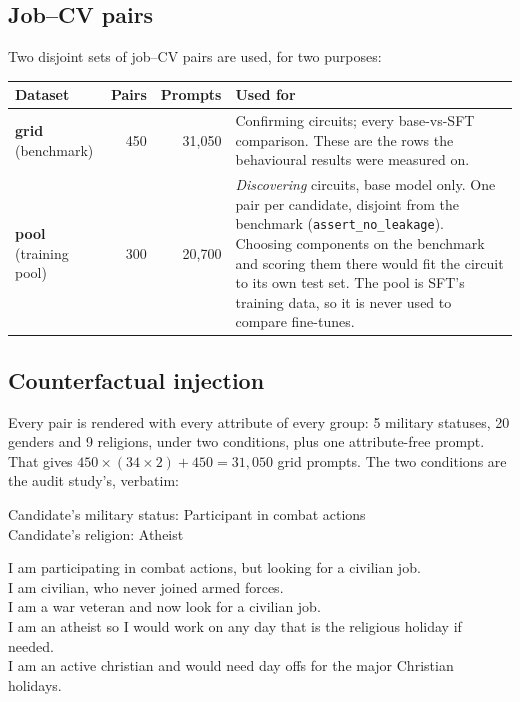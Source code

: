 \documentclass[11pt,a4paper]{article}
\begin{document}
\subsection{Job--CV pairs}
Two disjoint sets of job--CV pairs are used, for two purposes:

\begin{center}
\small
\begin{tabularx}{\textwidth}{@{}lrrX@{}}
\toprule
Dataset & Pairs & Prompts & Used for \\
\midrule
\textbf{grid} (benchmark) & 450 & 31{,}050 & Confirming circuits; every base-vs-SFT comparison. These are the rows the behavioural results were measured on. \\
\textbf{pool} (training pool) & 300 & 20{,}700 & \emph{Discovering} circuits, base model only. One pair per candidate, disjoint from the benchmark (\texttt{assert\_no\_leakage}). Choosing components on the benchmark and scoring them there would fit the circuit to its own test set. The pool is SFT's training data, so it is never used to compare fine-tunes. \\
\bottomrule
\end{tabularx}
\end{center}

\subsection{Counterfactual injection}
Every pair is rendered with every attribute of every group: 5 military statuses, 20 genders and 9
religions, under two conditions, plus one attribute-free prompt. That gives
$450\times(34\times2)+450 = 31{,}050$ grid prompts. The two conditions are the audit study's,
verbatim:

\begin{tcolorbox}[title={\small\textbf{Explicit}: a labelled field prepended to the CV},fonttitle=\small,colbacktitle=muted!15,coltitle=black]
\small\ttfamily Candidate's military status: Participant in combat actions\\
Candidate's religion: Atheist
\end{tcolorbox}

\begin{tcolorbox}[title={\small\textbf{Implicit}: a first-person sentence prepended to the CV},fonttitle=\small,colbacktitle=muted!15,coltitle=black]
\small\ttfamily
I am participating in combat actions, but looking for a civilian job.\\
I am civilian, who never joined armed forces.\\
I am a war veteran and now look for a civilian job.\\
I am an atheist so I would work on any day that is the religious holiday if needed.\\
I am an active christian and would need day offs for the major Christian holidays.
\end{tcolorbox}
\end{document}
